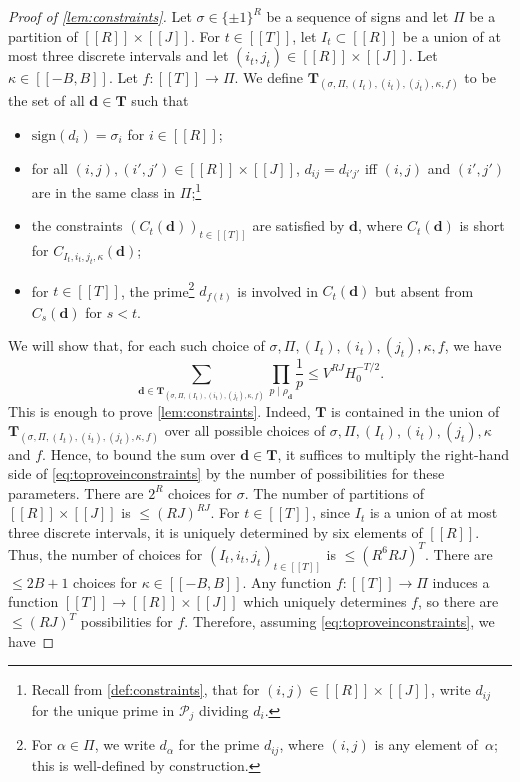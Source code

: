 \documentclass[11pt]{amsart}
\theoremstyle{definition}
\renewcommand{\leq}{\leqslant}
\newcommand{\interval}[2]{[\![#1,#2]\!] }
\newcommand{\sinterval}[1]{[\![#1]\!] }
\newcommand{\primes}{\mathcal{P}}
\renewcommand{\d}{\boldsymbol{d}}
\newcommand{\pcomp}[2]{d_{#1#2}}
\newcommand{\curlyL}{V}
\newcommand{\fprod}[1]{\rho_{#1}}
\newcommand{\pall}{\fprod{\d}}
\newcommand{\XX}{\mathbf{T}}
\newcommand{\repR}{J}
\newcommand{\newR}{\sinterval{J}}
\newcommand{\tupsize}{R}
\newcommand{\ncond}{T}
\newcommand{\cshift}{\kappa}
\newcommand{\somesigns}{\sigma}
\begin{document}
\begin{proof}[Proof of \cref{lem:constraints}]
Let $\somesigns \in \{\pm1\}^{\tupsize}$ be a sequence of signs and let $\Pi$ be a partition of $\sinterval{\tupsize} \!\times\! \newR$. For $t\in \sinterval{\ncond}$, let $I_t\subset \sinterval{\tupsize}$ be a union of at most three discrete intervals and let $(i_t,j_t)\in \sinterval{\tupsize} \!\times\! \newR$. Let $\cshift\in \interval{-B}{B}$. Let $f : \sinterval{\ncond} \to \Pi$. We define $\XX_{(\somesigns,\Pi, (I_t),(i_t),(j_t),\cshift,f)}$ to be the set of all $\d\in \XX$ such that 
\begin{itemize}
	\item $\mathrm{sign}(d_i) = \somesigns_i$ for $i\in \sinterval{\tupsize}$;
	\item for all $(i,j), (i',j')\in \sinterval{\tupsize} \!\times\! \newR$, $\pcomp{i}{j} =\pcomp{i'}{j'}$ iff $(i,j)$ and $(i',j')$ are in the same class in $\Pi$;\footnote{Recall from \cref{def:constraints}, that for $(i,j)\in \sinterval{\tupsize} \!\times\! \newR$, write $\pcomp{i}{j}$ for the unique prime in $\primes_j$ dividing $d_i$.}
	\item the constraints $(C_{t} (\d))_{t\in \sinterval{\ncond}}$ are satisfied by $\d$, where $C_t(\d)$ is short for $C_{I_t, i_t, j_t, \cshift} (\d)$;
	\item for $t\in \sinterval{\ncond}$, the prime\footnote{For $\alpha\in \Pi$, we write $d_{\alpha}$ for the prime $\pcomp{i}{j}$, where $(i,j)$ is any element of~$\alpha$; this is well-defined by construction.} $d_{f(t)}$ is involved in $C_{t}(\d)$ but absent from $C_s(\d)$ for $s<t$.
\end{itemize}
We will show that, for each such choice of $\somesigns,\Pi, (I_t),(i_t),(j_t),\cshift,f$, we have
\begin{equation}
\label{eq:toproveinconstraints}
	\sum_{\d\in \XX_{(\somesigns,\Pi, (I_t),(i_t),(j_t),\cshift,f)}}  \prod_{p\mid \pall} \frac1p \leq  \curlyL^{\tupsize \repR} H_0^{-\ncond/2}.
\end{equation}
This is enough to prove \cref{lem:constraints}. Indeed, $\XX$ is contained in the union of $\XX_{(\somesigns,\Pi, (I_t),(i_t),(j_t),\cshift,f)}$ over all possible choices of $\somesigns,\Pi, (I_t),(i_t),(j_t),\cshift$ and $f$. Hence, to bound the sum over $\d\in \XX$, it suffices to multiply the right-hand side of \cref{eq:toproveinconstraints} by the number of possibilities for these parameters. There are $2^{\tupsize}$ choices for $\somesigns$. The number of partitions of $\sinterval{\tupsize} \!\times\! \newR$ is $\leq (\tupsize\repR)^{\tupsize \repR}$. For $t\in \sinterval{\ncond}$, since $I_t$ is a union of at most three discrete intervals, it is uniquely determined by six elements of $\sinterval{\tupsize}$. Thus, the number of choices for $(I_t, i_t, j_t)_{t\in \sinterval{\ncond}}$ is $\leq (\tupsize^{6}\tupsize\repR)^{\ncond}$. There are $\leq 2B+1$ choices for $\cshift\in \interval{-B}{B}$. Any function $f :  \sinterval{\ncond} \to \Pi$ induces a function $\sinterval{\ncond} \to\sinterval{\tupsize} \!\times\! \newR$ which uniquely determines $f$, so there are $\leq (\tupsize \repR)^{\ncond}$ possibilities for $f$. Therefore, assuming \cref{eq:toproveinconstraints}, we have

\end{proof}
\end{document}
